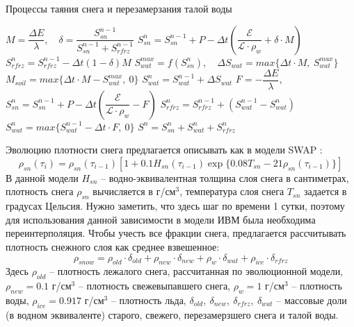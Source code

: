 \documentclass[a4paper, fontsize=12pt]{scrartcl}
\begin{document}
\begin{algorithm}[H]
\caption{Процессы таяния снега и перезамерзания талой воды}
\label{alg:setup}
\begin{algorithmic}[]
        \State $ M = \dfrac{\Delta E}{\lambda} $, ~ $ \delta = \dfrac{S_{sn}^{n-1}}{S_{sn}^{n-1} + S_{rfrz}^{n - 1}}$ 
        \State $ S_{sn}^n = S_{sn}^{n-1} + P - \Delta t \left( \dfrac{\mathcal{E}}{\mathcal{L} \cdot \rho_w} + \delta \cdot M \right) $ 
        \State $ S_{rfrz}^n = S_{rfrz}^{n - 1} - \Delta t (1 - \delta)M $ 
        \State $ S_{wat}^{max} = f( S_{sn}^n ) $, ~ $ \Delta S_{wat} = max\{\Delta t \cdot M, ~S_{wat}^{max}\} $ 
        \State $ M_{soil} = max\{\Delta t \cdot M - S_{wat}^{max}, ~0\} $ 
        \State $ S_{wat}^n = S_{wat}^{n-1} + \Delta S_{wat} $ 
    \Else
            \State $F = -\dfrac{\Delta E}{\lambda}$, ~ $S_{sn}^n = S_{sn}^{n-1} + P - \Delta t \left( \dfrac{\mathcal{E}}{\mathcal{L} \cdot \rho_w} - F \right)$
            \State $S_{rfrz}^n = S_{rfrz}^{n - 1} + ( S_{wat}^{n-1} - S_{wat}^n )$
            \State $S_{wat}^n = max\{ S_{wat}^{n-1} - \Delta t \cdot F, ~0\}$
        \EndIf
    \EndIf
    \State $S^n = S_{sn}^n + S_{wat}^n + S_{rfrz}^n$
\end{algorithmic}
\end{algorithm}



Эволюцию плотности снега предлагается описывать как в модели SWAP \cite{Gusev2002, Yosida1955}:
\begin{equation}
    \rho_{sn}(\tau_i) = \rho_{sn}(\tau_{i-1}) \left[  1 + 0.1 H_{sn}(\tau_{i-1}) \exp \{ 0.08 T_{sn} - 21 \rho_{sn}(\tau_{i-1})  \} \right]    \label{sysRHOOLD}  
\end{equation}
В данной модели $H_{sn}$ -- водно-эквивалентная толщина слоя снега в сантиметрах, плотность снега $\rho_{sn}$ вычисляется в г/см$^3$, температура слоя снега $T_{sn}$ задается в градусах Цельсия. Нужно заметить, что здесь шаг по времени 1 сутки, поэтому для использования данной зависимости в модели ИВМ была необходима переинтерполяция. Чтобы учесть все фракции снега, предлагается рассчитывать плотность снежного слоя как среднее взвешенное:
\begin{equation}
    \rho_{snow} = \rho_{old} \cdot \delta_{old} + \rho_{new} \cdot \delta_{new} + \rho_{w} \cdot \delta_{wat} + \rho_{ice} \cdot \delta_{rfrz}
\end{equation}
Здесь $\rho_{old}$ -- плотность лежалого снега, рассчитанная по эволюционной модели,  $\rho_{new} = 0.1$ г/см$^3$ -- плотность свежевыпавшего снега, $\rho_{w} = 1$ г/см$^3$ -- плотность воды, $\rho_{ice} = 0.917$ г/см$^3$ -- плотность льда, $\delta_{old}, ~\delta_{new}, ~\delta_{rfrz}, ~ \delta_{wat}$  -- массовые доли (в водном эквиваленте) старого, свежего, перезамерзшего снега и талой воды.
\end{document}
